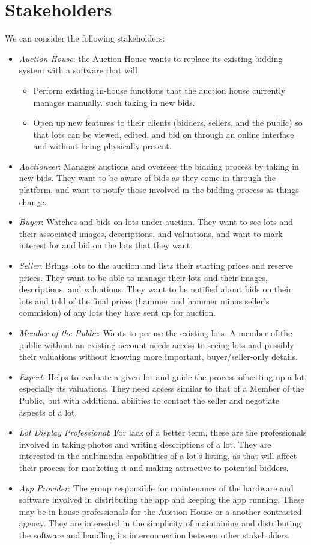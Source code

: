 \documentclass[titlepage, 12pt]{extarticle}
\begin{document}
\section{Stakeholders}
We can consider the following stakeholders:
\begin{itemize}
\item {\it Auction House}: the Auction House wants to replace its existing bidding system with a software that will
    \begin{itemize}
    \item Perform existing in-house functions that the auction house currently manages manually. such taking in new bids.
    \item Open up new features to their clients (bidders, sellers, and the public) so that lots can be viewed, edited, and bid on through an online interface and without being physically present.
    \end{itemize}
\item {\it Auctioneer}: Manages auctions and oversees the bidding process by taking in new bids. They want to be aware of bids as they come in through the platform, and want to notify those involved in the bidding process as things change.
\item {\it Buyer}: Watches and bids on lots under auction. They want to see lots and their associated images, descriptions, and valuations, and want to mark interest for and bid on the lots that they want.
\item {\it Seller}: Brings lots to the auction and lists their starting prices and reserve prices. They want to be able to manage their lots and their images, descriptions, and valuations. They want to be notified about bids on their lots and told of the final prices (hammer and hammer minus seller's commision) of any lots they have sent up for auction.
\item {\it Member of the Public}: Wants to peruse the existing lots. A member of the public without an existing account needs access to seeing lots and possibly their valuations without knowing more important, buyer/seller-only details.
\item {\it Expert}: Helps to evaluate a given lot and guide the process of setting up a lot, especially its valuations. They need access similar to that of a Member of the Public, but with additional abilities to contact the seller and negotiate aspects of a lot.
\item {\it Lot Display Professional}: For lack of a better term, these are the professionals involved in taking photos and writing descriptions of a lot. They are interested in the multimedia capabilities of a lot's listing, as that will affect their process for marketing it and making attractive to potential bidders.
\item {\it App Provider}: The group responsible for maintenance of the hardware and software involved in distributing the app and keeping the app running. These may be in-house professionals for the Auction House or a another contracted agency. They are interested in the simplicity of maintaining and distributing the software and handling its interconnection between other stakeholders.
\end{itemize}
\end{document}
